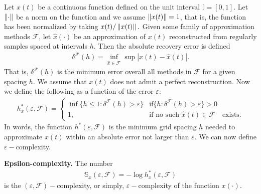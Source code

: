   Let $x(t)$ be a continuous function defined on the 
  unit interval $ \mathbb{I} = [0,1]$. Let $\left\lVert\cdot\right\rVert$ be a norm on the function and we assume $\left\lVert x(t)\right\rVert = 1$, that is, the function has been normalized 
  by taking $x(t)/\left\lVert x(t)\right\rVert.$ Given some family of approximation 
  methods $\mathcal{F}$, let $\hat x(\cdot)$ be an approximation
  of $x(t)$ reconstructed from regularly samples spaced at intervals $h$. Then the absolute recovery error is defined 
  \begin{align}
    \delta^{\mathcal{F}}(h) = \inf_{\hat x \in \mathcal{F}} 
    \sup | x(t) - \hat x(t)|.
  \end{align}
  That is, $\delta^{\mathcal{F}}(h)$ is the minimum error overall 
  all methods in $\mathcal{F}$ for a given spacing $h$.
  We assume that $x(t)$ does not admit a perfect 
  reconstruction. Now we define the following as a function 
  of the error $\varepsilon$:
    \begin{align*}
      h_x^*(\varepsilon, \mathcal{F}) = \begin{cases}
      \inf \{ h \leq 1 : \delta^{\mathcal{F}}(h) > \varepsilon \} & \text{if} 
      \{ h : \delta^{\mathcal{F}}(h) > \varepsilon \} > 0  \\ 
        1, &  \text{if no such } \hat x(t) \in \mathcal{F} \hspace{1em}\text{exists.}
    \end{cases}
  \end{align*}
  In words, the function $h^*(\varepsilon, \mathcal{F})$ is the minimum grid spacing $h$ needed to approximate $x(t)$ within an absolute error not larger than $\varepsilon$. We can now define $\varepsilon-$complexity. 
  \begin{defn}{\textbf{Epsilon-complexity.} }\label{def:ecomplexity}
  The number
  \begin{align}
    \mathbb{S}_x(\varepsilon, \mathcal{F}) =  
    -\log h_x^*(\varepsilon, \mathcal{F}) 
  \end{align}
  is the $(\varepsilon, \mathcal{F})-$complexity, 
  or simply, $\varepsilon-$complexity of the function $x(\cdot)$. 
  \end{defn}

